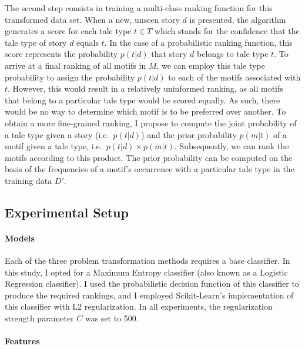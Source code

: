 The second step consists in training a multi-class ranking function for this transformed data set. When a new, unseen story $d$ is presented, the algorithm generates a score for each tale type $t \in T$ which stands for the confidence that the tale type of story $d$ equals $t$. In the case of a probabilistic ranking function, this score represents the probability $p(t|d)$ that story $d$ belongs to tale type $t$. To arrive at a final ranking of all motifs in $M$, we can employ this tale type probability to assign the probability $p(t|d)$ to each of the motifs associated with $t$. However, this would result in a relatively uninformed ranking, as all motifs that belong to a particular tale type would be scored equally. As such, there would be no way to determine which motif is to be preferred over another. To obtain a more fine-grained ranking, I propose to compute the joint probability of a tale type given a story (i.e.\ $p(t|d)$) and the prior probability $p(m|t)$ of a motif given a tale type, i.e.\ $p(t|d) \times p(m|t)$. Subsequently, we can rank the motifs according to this product. The prior probability can be computed on the basis of the frequencies of a motif's occurrence with a particular tale type in the training data $D'$. 

\subsection{Experimental Setup}\label{sec:classification-setup}

\paragraph{Models}

Each of the three problem transformation methods requires a base classifier. In this study, I opted for a Maximum Entropy classifier (also known as a Logistic Regression classifier). I used the probabilistic decision function of this classifier to produce the required rankings, and I employed Scikit-Learn's implementation of this classifier with L2 regularization. In all experiments, the regularization strength parameter $C$ was set to 500.\autocite{sklearn:2011}

\paragraph{Features}

